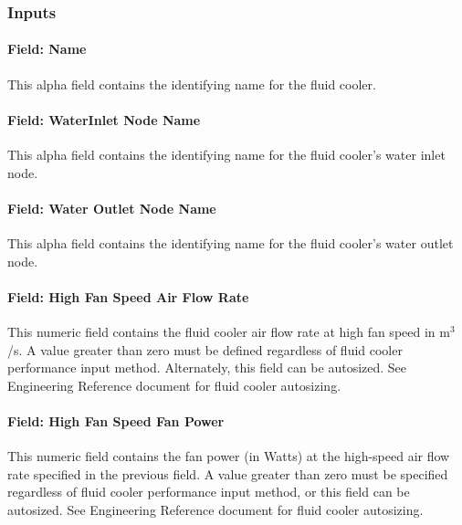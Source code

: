 \subsubsection{Inputs}\label{inputs-7-004}

\paragraph{Field: Name}\label{field-name-6-004}

This alpha field contains the identifying name for the fluid cooler.

\paragraph{Field: WaterInlet Node Name}\label{field-waterinlet-node-name}

This alpha field contains the identifying name for the fluid cooler's water inlet node.

\paragraph{Field: Water Outlet Node Name}\label{field-water-outlet-node-name-5}

This alpha field contains the identifying name for the fluid cooler's water outlet node.

\paragraph{Field: High Fan Speed Air Flow Rate}\label{field-high-fan-speed-air-flow-rate-1}

This numeric field contains the fluid cooler air flow rate at high fan speed in m\(^{3}\)/s. A value greater than zero must be defined regardless of fluid cooler performance input method. Alternately, this field can be autosized. See Engineering Reference document for fluid cooler autosizing.

\paragraph{Field: High Fan Speed Fan Power}\label{field-high-fan-speed-fan-power}

This numeric field contains the fan power (in Watts) at the high-speed air flow rate specified in the previous field. A value greater than zero must be specified regardless of fluid cooler performance input method, or this field can be autosized. See Engineering Reference document for fluid cooler autosizing.

